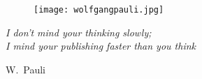 
\begin{frame}
\begin{figure}
\centering
\texttt{[image: wolfgangpauli.jpg]}
\end{figure}

\textit{I don't mind your thinking slowly;\\
I mind your publishing faster than you think}

\vspace{.25cm}

W.~Pauli
\end{frame}




